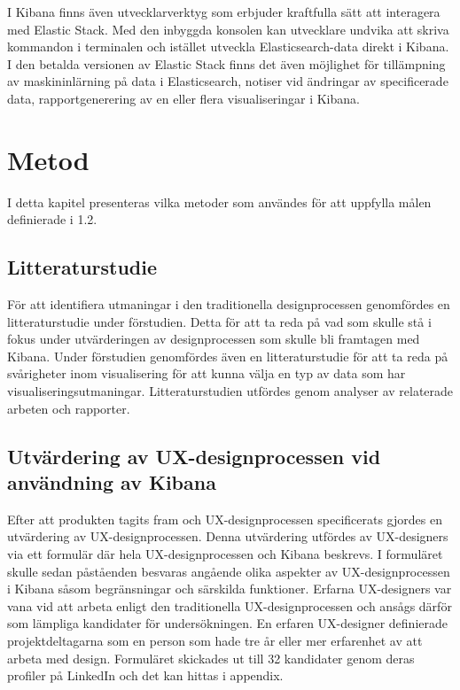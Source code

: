 \documentclass[12pt]{kththesis}
\begin{document}
I Kibana finns även utvecklarverktyg som erbjuder kraftfulla sätt att interagera med Elastic Stack. Med den inbyggda konsolen kan utvecklare undvika att skriva kommandon i terminalen och istället utveckla Elasticsearch-data direkt i Kibana. I den betalda versionen av Elastic Stack finns det även möjlighet för tillämpning av maskininlärning på data i Elasticsearch, notiser vid ändringar av specificerade data, rapportgenerering av en eller flera visualiseringar i Kibana.

\afterpage{\null\newpage}
\chapter{Metod}

I detta kapitel presenteras vilka metoder som användes för att uppfylla målen definierade i 1.2.

\section{Litteraturstudie}

För att identifiera utmaningar i den traditionella designprocessen genomfördes en litteraturstudie under förstudien. Detta för att ta reda på vad som skulle stå i fokus under utvärderingen av designprocessen som skulle bli framtagen med Kibana. Under förstudien genomfördes även en litteraturstudie för att ta reda på svårigheter inom visualisering för att kunna välja en typ av data som har visualiseringsutmaningar. Litteraturstudien utfördes genom analyser av relaterade arbeten och rapporter.

\section{Utvärdering av UX-designprocessen vid användning av Kibana}

Efter att produkten tagits fram och UX-designprocessen specificerats gjordes en utvärdering av UX-designprocessen. Denna utvärdering utfördes av UX-designers via ett formulär där hela UX-designprocessen och Kibana beskrevs. I formuläret skulle sedan påståenden besvaras angående olika aspekter av UX-designprocessen i Kibana såsom begränsningar och särskilda funktioner. Erfarna UX-designers var vana vid att arbeta enligt den traditionella UX-designprocessen och ansågs därför som lämpliga kandidater för undersökningen. En erfaren UX-designer definierade projektdeltagarna som en person som hade tre år eller mer erfarenhet av att arbeta med design. Formuläret skickades ut till 32 kandidater genom deras profiler på LinkedIn och det kan hittas i appendix.
\end{document}

